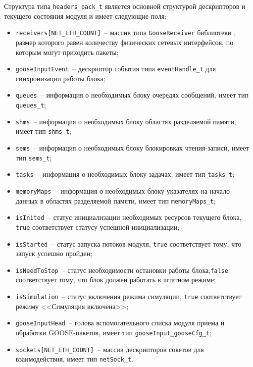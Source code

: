 Структура типа \lstinline{headers_pack_t} является основной структурой дескрипторов и текущего состояния модуля и имеет следующие поля:

\begin{itemize}
    \item \lstinline{receivers[NET_ETH_COUNT]}~-- массив типа \lstinline{GooseReceiver} библиотеки \libIec, размер которого равен количеству физических сетевых интерфейсов, по которым могут приходить пакеты;
    \item \lstinline{gooseInputEvent}~-- дескриптор события типа \lstinline{eventHandle_t} для синхронизации работы блока;
    \item \lstinline{queues}~-- информация о необходимых блоку очередях сообщений, имеет тип \lstinline{queues_t};
    \item \lstinline{shms}~-- информация о необходимых блоку областях разделяемой памяти, имеет тип \lstinline{shms_t};
    \item \lstinline{sems}~-- информация о необходимых блоку блокировках чтения-записи, имеет тип \lstinline{sems_t};
    \item \lstinline{tasks}~-- информация о необходимых блоку задачах, имеет тип \lstinline{tasks_t};
    \item \lstinline{memoryMaps}~-- информация о необходимых блоку указателях на начало данных в областях разделяемой памяти, имеет тип \lstinline{memoryMaps_t};
    \item \lstinline{isInited}~-- статус инициализации необходимых ресурсов текущего блока, \lstinline{true} соответствует статусу успешной инициализации;
    \item \lstinline{isStarted}~-- статус запуска потоков модуля, \lstinline{true} соответствует тому, что запуск успешно пройден;
    \item \lstinline{isNeedToStop}~-- статус необходимости остановки работы блока,\lstinline{false} соответствует тому, что блок должен работать в штатном режиме;
    \item \lstinline{isSimulation}~-- статус включения режима симуляции, \lstinline{true} соответствует режиму <<Симуляция включена>>;
    \item \lstinline{gooseInputHead}~-- голова вспомогательного списка модуля приема и обработки GOOSE-пакетов, имеет тип \lstinline{gooseInput_gooseCfg_t};
    \item \lstinline{sockets[NET_ETH_COUNT]}~-- массив дескрипторов сокетов для взаимодействия, имеет тип \lstinline{netSock_t}.
\end{itemize}

